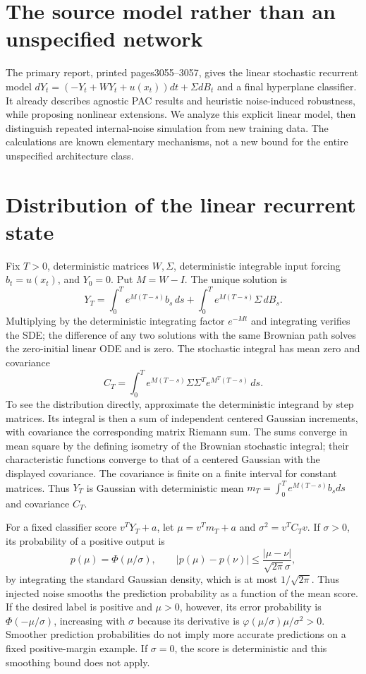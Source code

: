 \documentclass[11pt]{article}
\begin{document}
\section{The source model rather than an unspecified network}
The primary report, printed pages3055--3057, gives the linear
stochastic recurrent model
$dY_t=(-Y_t+WY_t+u(x_t))dt+\Sigma dB_t$ and a final
hyperplane classifier. It already describes agnostic PAC
results and heuristic noise-induced robustness, while proposing
nonlinear extensions. We analyze this explicit linear model,
then distinguish repeated internal-noise simulation from new
training data. The calculations are known elementary mechanisms,
not a new bound for the entire unspecified architecture class.

\section{Distribution of the linear recurrent state}
Fix $T>0$, deterministic matrices $W,\Sigma$, deterministic
integrable input forcing $b_t=u(x_t)$, and $Y_0=0$.
Put $M=W-I$. The unique solution is
\[
 Y_T=\int_0^T e^{M(T-s)}b_s\,ds
       +\int_0^T e^{M(T-s)}\Sigma\,dB_s.
\]
Multiplying by the deterministic integrating factor $e^{-Mt}$
and integrating verifies the SDE; the difference of any two
solutions with the same Brownian path solves the zero-initial
linear ODE and is zero. The stochastic integral has mean zero
and covariance
\[
 C_T=\int_0^T e^{M(T-s)}\Sigma\Sigma^T e^{M^T(T-s)}\,ds.
\]
To see the distribution directly, approximate the deterministic
integrand by step matrices. Its integral is then a sum of
independent centered Gaussian increments, with covariance the
corresponding matrix Riemann sum. The sums converge in mean
square by the defining isometry of the Brownian stochastic
integral; their characteristic functions converge to that of
a centered Gaussian with the displayed covariance. The
covariance is finite on a finite interval for constant matrices.
Thus $Y_T$ is Gaussian with deterministic mean
$m_T=\int_0^T e^{M(T-s)}b_sds$ and covariance $C_T$.

For a fixed classifier score $v^TY_T+a$, let
$\mu=v^Tm_T+a$ and $\sigma^2=v^TC_Tv$. If $\sigma>0$,
its probability of a positive output is
\[
 p(\mu)=\Phi(\mu/\sigma),\qquad
 |p(\mu)-p(\nu)|\le\frac{|\mu-\nu|}{\sqrt{2\pi}\sigma},
\]
by integrating the standard Gaussian density, which is at most
$1/\sqrt{2\pi}$. Thus injected noise smooths the prediction
probability as a function of the mean score. If the desired
label is positive and $\mu>0$, however, its error probability
is $\Phi(-\mu/\sigma)$, increasing with $\sigma$ because
its derivative is
$\varphi(\mu/\sigma)\mu/\sigma^2>0$. Smoother prediction
probabilities do not imply more accurate predictions on a fixed
positive-margin example. If $\sigma=0$, the score is
deterministic and this smoothing bound does not apply.
\end{document}
